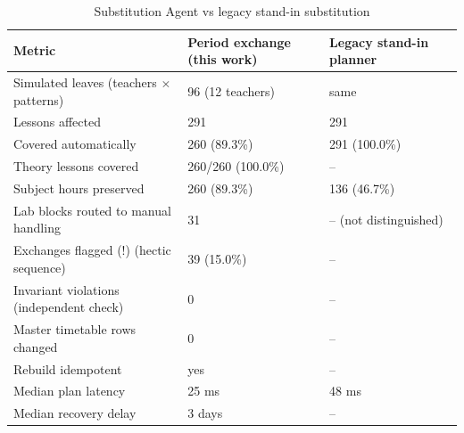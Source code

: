 \begin{table}[t]
\centering
\small
\begin{tabular}{lll}
\toprule
Metric & Period exchange (this work) & Legacy stand-in planner \\
\midrule
Simulated leaves (teachers $\times$ patterns) & 96 (12 teachers) & same \\
Lessons affected & 291 & 291 \\
Covered automatically & 260 (89.3\%) & 291 (100.0\%) \\
Theory lessons covered & 260/260 (100.0\%) & -- \\
Subject hours preserved & 260 (89.3\%) & 136 (46.7\%) \\
Lab blocks routed to manual handling & 31 & -- (not distinguished) \\
Exchanges flagged (!) (hectic sequence) & 39 (15.0\%) & -- \\
Invariant violations (independent check) & 0 & -- \\
Master timetable rows changed & 0 & -- \\
Rebuild idempotent & yes & -- \\
Median plan latency & 25 ms & 48 ms \\
Median recovery delay & 3 days & -- \\
\bottomrule
\end{tabular}
\caption{Substitution Agent vs legacy stand-in substitution}
\label{tab:t9-exchange}
\end{table}
